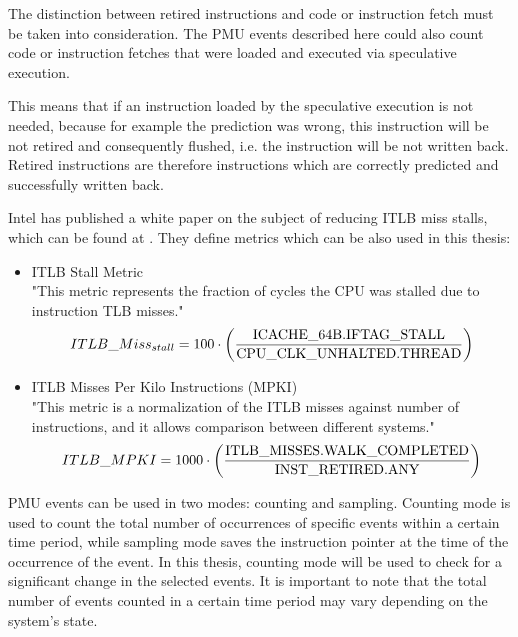 The distinction between retired instructions and code or instruction fetch must be taken into consideration. The PMU events described here could also count code or instruction fetches that were loaded and executed via speculative execution. \cite[p. 34-35, 46]{patmc} \cite{intel_retired}
\enlargethispage{\baselineskip}

This means that if an instruction loaded by the speculative execution is not needed, because for example the prediction was wrong, this instruction will be not retired and consequently flushed, i.e. the instruction will be not written back. Retired instructions are therefore instructions which are correctly predicted and successfully written back. \cite[p. 46]{patmc} \cite{intel_retired}

Intel has published a white paper on the subject of reducing ITLB miss stalls, which can be found at \cite{intel_opt_runtime}. They define metrics which can be also used in this thesis:

\begin{itemize}
    \item ITLB Stall Metric\\
    "This metric represents the fraction of cycles the CPU was stalled due to instruction TLB misses." \cite{intel_opt_runtime}
    \begin{align*}
        ITLB\_Miss_{stall} = 100 \cdot 
        \left( \frac{\spcstring{ICACHE_64B.IFTAG_STALL}}{\spcstring{CPU_CLK_UNHALTED.THREAD}} \right)
    \end{align*}
    \item  ITLB Misses Per Kilo Instructions (MPKI)\\
    "This metric is a normalization of the ITLB misses against number of instructions, and it allows comparison between different systems." \cite{intel_opt_runtime}
    \begin{align*}
        ITLB\_MPKI = 1000 \cdot \left( \frac{\spcstring{ITLB_MISSES.WALK_COMPLETED}}{\spcstring{INST_RETIRED.ANY}} \right)
    \end{align*}
\end{itemize}

PMU events can be used in two modes: counting and sampling. Counting mode is used to count the total number of occurrences of specific events within a certain time period, while sampling mode saves the instruction pointer at the time of the occurrence of the event. \cite[p. 55-56, 59-60]{patmc} \cite[p. 157-158]{brendan} In this thesis, counting mode will be used to check for a significant change in the selected events. It is important to note that the total number of events counted in a certain time period may vary depending on the system's state.
\vspace{-\baselineskip}

